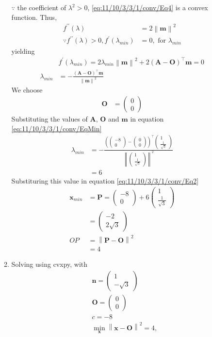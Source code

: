 \documentclass[12pt]{article}
\providecommand{\brak}[1]{\ensuremath{\left(#1\right)}}
\providecommand{\norm}[1]{\left\lVert#1\right\rVert}
\newcommand{\myvec}[1]{\ensuremath{\begin{pmatrix}#1\end{pmatrix}}}
\let\vec\mathbf
\begin{document}
\begin{enumerate}
\begin{enumerate}
$\because$ the coefficient of $\lambda^2> 0$, \eqref{eq:11/10/3/3/1/conv/Eq4} is a convex function.
Thus,
\begin{align}
	f^{\prime\prime}\brak{\lambda} &= 2\norm{\vec{m}}^2 \\ 
	\because f^{\prime\prime}\brak{\lambda} > 0, f^\prime\brak{\lambda_{min}} &= 0, \text{ for } \lambda_{min}
\end{align}
yielding
\begin{align}
	& f^\prime\brak{\lambda_{min}} =  2\lambda_{min}\norm{\vec{m}}^2 + 2\brak{\vec{A}-\vec{O}}^\top\vec{m}  = 0 \\
	\label{eq:11/10/3/3/1/conv/EqMin}
	\lambda_{min} &= -\frac{\brak{\vec{A}-\vec{O}}^\top\vec{m}}{\norm{\vec{m}}^2} 
\end{align}
We choose  
\begin{align}
	\vec{O} &= \myvec{ 0 \\ 0}
\end{align}
Substituting the values of $\vec{A}$, $\vec{O}$ and $\vec{m}$ in equation \eqref{eq:11/10/3/3/1/conv/EqMin}
\begin{align}
	\lambda_{min} &= -\frac{\brak{\myvec{-8 \\ 0 }-\myvec{0 \\ 0}}^\top\myvec{1 \\ \frac{1}{\sqrt{3}}}}{\norm{\myvec{1 \\ \frac{1}{\sqrt{3}}}}^2}\\ 
	&= 6
\end{align}
Substituring this value in equation \eqref{eq:11/10/3/3/1/conv/Eq2}
\begin{align}
	\vec{x}_{min} &= \vec{P} = \myvec{-8 \\ 0}+6\myvec{1 \\ \frac{1}{\sqrt{3}}}  \\
	&= \myvec{-2 \\ 2\sqrt{3}} \\
	OP &= \norm{\vec{P}-\vec{O}}^2 \\ 
	&  = 4
\end{align}
\item Solving using cvxpy, with 
\begin{align}
	&\vec{n} = \myvec{1 \\ -\sqrt{3}} \\
	&\vec{O} = \myvec{0 \\ 0} \\
	&c = -8 \\
	\label{eq:11/10/3/3/1/conv/minval}
	&  \min_{\vec{x}} \norm{\vec{x}-\vec{O}}^2 = 4, 

\end{align}
\end{enumerate}
\end{enumerate}
\end{document}
